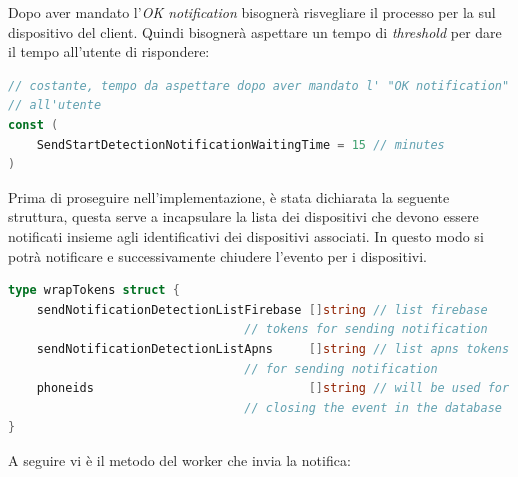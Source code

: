 \documentclass[main.tex]{subfiles}
\begin{document}
Dopo aver mandato l'\emph{OK notification} bisognerà risvegliare il processo per la  sul dispositivo del client. Quindi bisognerà aspettare un tempo di \emph{threshold} per dare il tempo all'utente di rispondere:
\begin{lstlisting}[language=go]
// costante, tempo da aspettare dopo aver mandato l' "OK notification"
// all'utente
const (
    SendStartDetectionNotificationWaitingTime = 15 // minutes
)
\end{lstlisting}
Prima di proseguire nell'implementazione, è stata dichiarata la seguente struttura, questa serve a incapsulare la lista dei dispositivi che devono essere notificati insieme agli identificativi dei dispositivi associati. In questo modo si potrà notificare e successivamente chiudere l'evento per i dispositivi. 
\begin{lstlisting}[language=go]
type wrapTokens struct {
    sendNotificationDetectionListFirebase []string // list firebase 
                                 // tokens for sending notification
    sendNotificationDetectionListApns     []string // list apns tokens 
                                 // for sending notification
    phoneids                              []string // will be used for 
                                 // closing the event in the database
}
\end{lstlisting}
A seguire vi è il metodo del worker che invia la notifica:
\end{document}
